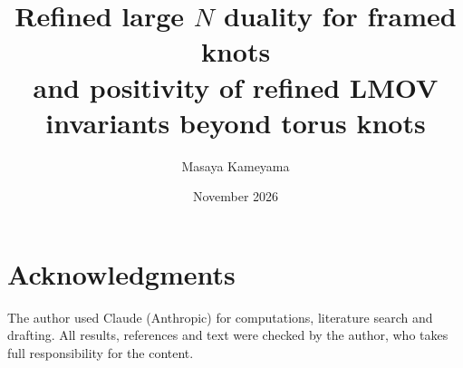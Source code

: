 \documentclass[11pt,a4paper]{article}
\title{Refined large $N$ duality for framed knots\\ and positivity of refined LMOV invariants beyond torus knots}
\author{Masaya Kameyama}
\date{November 2026}
\theoremstyle{definition}
\theoremstyle{remark}
\begin{document}
\maketitle

\tableofcontents











\section*{Acknowledgments}
The author used Claude (Anthropic) for computations, literature search and drafting.
All results, references and text were checked by the author, who takes full responsibility for the content.

\appendix


\printbibliography
\end{document}
